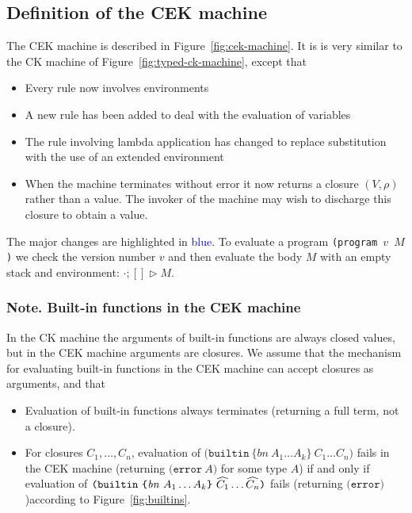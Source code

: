 \documentclass[a4paper]{article}
\newcommand{\blue}[1]{\textcolor{blue}{#1}}
\newcommand{\keyword}[1]{\texttt{#1}}
\newcommand{\construct}[1]{\texttt{(} #1 \texttt{)}}
\newcommand\discharge[1]{\widehat{#1}}
\newcommand{\builtin}[3]{\construct{\keyword{builtin} ~ \texttt{\{} \mathit{#1} ~ #2 \texttt{\}} ~ #3}}
\newcommand{\error}[1]{\construct{\keyword{error} ~ #1}}
\newcommand{\errorU}{\construct{\keyword{error}}}
\newcommand{\compute}{\triangleright}
\begin{document}
\begin{appendices}
\subsection{Definition of the CEK machine}
The CEK machine is described in Figure~\ref{fig:cek-machine}.  It is
  is very similar to the CK machine of Figure~\ref{fig:typed-ck-machine},
  except that
\begin{itemize}
\item Every rule now involves environments
\item A new rule has been added to deal with the evaluation of variables
\item The rule involving lambda application has changed to replace substitution with
the use of an extended environment
\item When the machine terminates without error it now
returns a closure $(V,\rho)$ rather than a value.  The invoker
of the machine may wish to discharge this closure to obtain a value.
\end{itemize}
\noindent The major changes are highlighted in \blue{blue}. To evaluate a program
\texttt{(program $v$ $M$)} we check the version number $v$ and then evaluate the body $M$
with an empty stack and environment: $\cdot;[] \compute M$.



\subsubsection{Note. Built-in functions in the CEK machine}
\label{sec:typed-cek-builtins}
In the CK machine the arguments of built-in functions are always
closed values, but in the CEK machine arguments are closures.  We
assume that the mechanism for evaluating built-in functions in the CEK
machine can accept closures as arguments, and that
\begin{itemize}
\item Evaluation of built-in functions always terminates (returning a full term, not
a closure).

\item For closures $C_1, \ldots, C_n$, evaluation of
  $\builtin{bn}{A_1 \ldots A_k}{C_1 \ldots C_n}$ fails in the CEK
machine (returning $\error{A}$ for some type $A$) if and only
if evaluation of $\builtin{bn}{A_1 \\ \ldots  %
A_k}{\discharge{C_1} \ldots \discharge{C_n}}$ fails (returning $\errorU$)according to
Figure~\ref{fig:builtins}.


\end{itemize}
\end{appendices}
\end{document}
